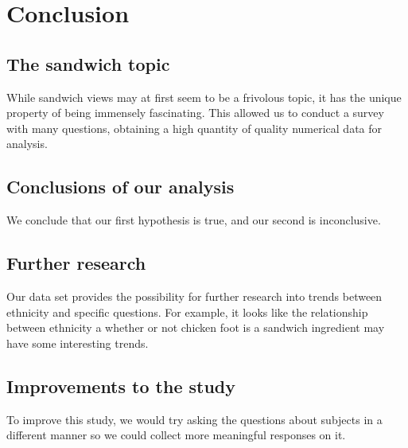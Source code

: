 \chapter{Conclusion}

\section{The sandwich topic}
While sandwich views may at first seem to be a frivolous topic, it has the unique property of being immensely fascinating.
This allowed us to conduct a survey with many questions, obtaining a high quantity of quality numerical data for analysis.

\section{Conclusions of our analysis}
We conclude that our first hypothesis is true, and our second is inconclusive.

\section{Further research}
Our data set provides the possibility for further research into trends between ethnicity and specific questions.
For example, it looks like the relationship between ethnicity a whether or not chicken foot is a sandwich ingredient may have some interesting trends.

\section{Improvements to the study}
To improve this study, we would try asking the questions about subjects in a different manner so we could collect more meaningful responses on it.
